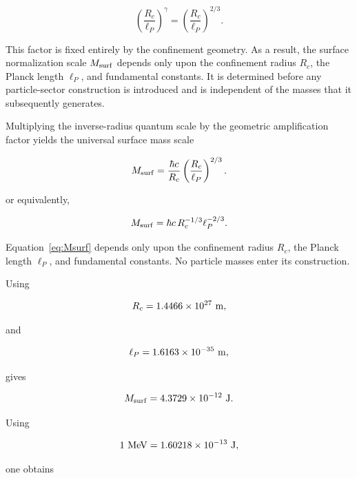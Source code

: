 \documentclass[11pt]{article}
\theoremstyle{definition}
\theoremstyle{remark}
\begin{document}
\begin{equation}
\left(
\frac{R_c}{\ell_P}
\right)^{\gamma}
=
\left(
\frac{R_c}{\ell_P}
\right)^{2/3}.
\label{eq:BoundaryAmplification}
\end{equation}

This factor is fixed entirely by the confinement geometry. As a
result, the surface normalization scale \(M_{\rm surf}\) depends
only upon the confinement radius \(R_c\), the Planck length
\(\ell_P\), and fundamental constants. It is determined before any
particle-sector construction is introduced and is independent of
the masses that it subsequently generates.

Multiplying the inverse-radius quantum scale by the geometric
amplification factor yields the universal surface mass scale

\begin{equation}
M_{\rm surf}
=
\frac{\hbar c}{R_c}
\left(
\frac{R_c}{\ell_P}
\right)^{2/3}.
\label{eq:Msurf}
\end{equation}

or equivalently,

\begin{equation}
M_{\rm surf}
=
\hbar c\,
R_c^{-1/3}
\ell_P^{-2/3}.
\label{eq:MsurfEquivalent}
\end{equation}

Equation~\eqref{eq:Msurf} depends only upon the confinement
radius \(R_c\), the Planck length \(\ell_P\), and fundamental
constants. No particle masses enter its construction.

Using

\begin{equation}
R_c = 1.4466\times10^{27}\ {\rm m},
\end{equation}

and

\begin{equation}
\ell_P = 1.6163\times10^{-35}\ {\rm m},
\end{equation}

gives

\begin{equation}
M_{\rm surf}
=
4.3729\times10^{-12}\ {\rm J}.
\label{eq:MsurfJoules}
\end{equation}

Using

\begin{equation}
1\ {\rm MeV}
=
1.60218\times10^{-13}\ {\rm J},
\end{equation}

one obtains
\end{document}
